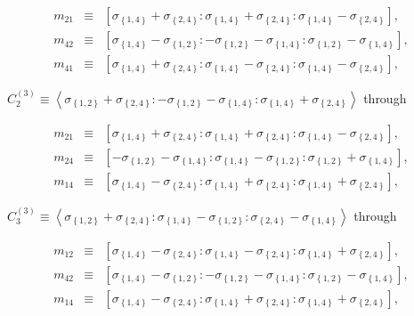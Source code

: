 \documentclass[11pt]{article}
\begin{document}
\begin{eqnarray*}
m_{21} &\equiv &\left[ \sigma _{\left\{ 1,4\right\} }+\sigma _{\left\{
2,4\right\} }:\sigma _{\left\{ 1,4\right\} }+\sigma _{\left\{ 2,4\right\}
}:\sigma _{\left\{ 1,4\right\} }-\sigma _{\left\{ 2,4\right\} }\right] , \\
m_{42} &\equiv &\left[ \sigma _{\left\{ 1,4\right\} }-\sigma _{\left\{
1,2\right\} }:-\sigma _{\left\{ 1,2\right\} }-\sigma _{\left\{ 1,4\right\}
}:\sigma _{\left\{ 1,2\right\} }-\sigma _{\left\{ 1,4\right\} }\right] , \\
m_{41} &\equiv &\left[ \sigma _{\left\{ 1,4\right\} }+\sigma _{\left\{
2,4\right\} }:\sigma _{\left\{ 1,4\right\} }-\sigma _{\left\{ 2,4\right\}
}:\sigma _{\left\{ 1,4\right\} }-\sigma _{\left\{ 2,4\right\} }\right] ,
\end{eqnarray*}

$C_{2}^{\left( 3\right) }\equiv \left\langle \sigma _{\left\{ 1,2\right\}
}+\sigma _{\left\{ 2,4\right\} }:-\sigma _{\left\{ 1,2\right\} }-\sigma
_{\left\{ 1,4\right\} }:\sigma _{\left\{ 1,4\right\} }+\sigma _{\left\{
2,4\right\} }\right\rangle $ through

\begin{eqnarray*}
m_{21} &\equiv &\left[ \sigma _{\left\{ 1,4\right\} }+\sigma _{\left\{
2,4\right\} }:\sigma _{\left\{ 1,4\right\} }+\sigma _{\left\{ 2,4\right\}
}:\sigma _{\left\{ 1,4\right\} }-\sigma _{\left\{ 2,4\right\} }\right] , \\
m_{24} &\equiv &\left[ -\sigma _{\left\{ 1,2\right\} }-\sigma _{\left\{
1,4\right\} }:\sigma _{\left\{ 1,4\right\} }-\sigma _{\left\{ 1,2\right\}
}:\sigma _{\left\{ 1,2\right\} }+\sigma _{\left\{ 1,4\right\} }\right] , \\
m_{14} &\equiv &\left[ \sigma _{\left\{ 1,4\right\} }-\sigma _{\left\{
2,4\right\} }:\sigma _{\left\{ 1,4\right\} }+\sigma _{\left\{ 2,4\right\}
}:\sigma _{\left\{ 1,4\right\} }+\sigma _{\left\{ 2,4\right\} }\right] ,
\end{eqnarray*}

$C_{3}^{\left( 3\right) }\equiv \left\langle \sigma _{\left\{ 1,2\right\}
}+\sigma _{\left\{ 2,4\right\} }:\sigma _{\left\{ 1,4\right\} }-\sigma
_{\left\{ 1,2\right\} }:\sigma _{\left\{ 2,4\right\} }-\sigma _{\left\{
1,4\right\} }\right\rangle $ through

\begin{eqnarray*}
m_{12} &\equiv &\left[ \sigma _{\left\{ 1,4\right\} }-\sigma _{\left\{
2,4\right\} }:\sigma _{\left\{ 1,4\right\} }-\sigma _{\left\{ 2,4\right\}
}:\sigma _{\left\{ 1,4\right\} }+\sigma _{\left\{ 2,4\right\} }\right] , \\
m_{42} &\equiv &\left[ \sigma _{\left\{ 1,4\right\} }-\sigma _{\left\{
1,2\right\} }:-\sigma _{\left\{ 1,2\right\} }-\sigma _{\left\{ 1,4\right\}
}:\sigma _{\left\{ 1,2\right\} }-\sigma _{\left\{ 1,4\right\} }\right] , \\
m_{14} &\equiv &\left[ \sigma _{\left\{ 1,4\right\} }-\sigma _{\left\{
2,4\right\} }:\sigma _{\left\{ 1,4\right\} }+\sigma _{\left\{ 2,4\right\}
}:\sigma _{\left\{ 1,4\right\} }+\sigma _{\left\{ 2,4\right\} }\right] ,
\end{eqnarray*}
\end{document}
